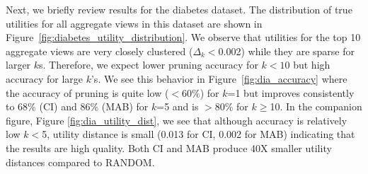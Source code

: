 Next, we briefly review results for the diabetes dataset.
The distribution of true utilities for all aggregate views in this dataset are shown in
Figure~\ref{fig:diabetes_utility_distribution}.
We observe that utilities for the top 10 aggregate views are very closely clustered ($\Delta_k<$0.002) while
they are sparse for larger $k$s.
Therefore, we expect lower pruning accuracy for $k<10$ but high accuracy for
large $k$'s.
We see this behavior in Figure~\ref{fig:dia_accuracy} where the accuracy of
pruning is quite low ($<60\%$) for $k$=1 but improves consistently to 68\% (CI) 
and 86\% (MAB) for $k$=5 and is $>$80\% for $k$$\geq$10.
In the companion figure, Figure \ref{fig:dia_utility_dist}, we see that although
accuracy is relatively low $k$$<$5, utility distance is small (0.013 for CI, 0.002
for MAB) indicating that the results are high quality.
Both CI and MAB produce 40X smaller utility distances compared to RANDOM.



